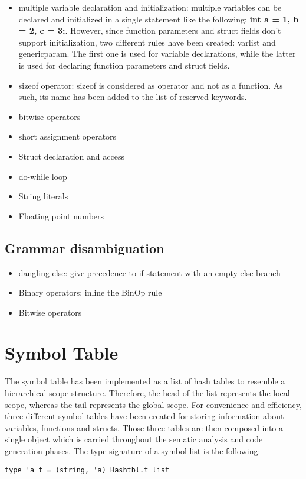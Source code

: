 \documentclass{article}
\begin{document}
\begin{itemize}
    \item multiple variable declaration and initialization: multiple variables can be declared and initialized in a single statement
    like the following: \textbf{int a = 1, b = 2, c = 3;}. However, since function parameters and struct fields don't support initialization,
    two different rules have been created: varlist and genericparam. The first one is used for variable declarations,
    while the latter is used for declaring function parameters and struct fields.
    \item sizeof operator: sizeof is considered as operator and not as a function. As such, its name has been added to the list of reserved keywords.
    \item bitwise operators
    \item short assignment operators
    \item Struct declaration and access
    \item do-while loop
    \item String literals
    \item Floating point numbers
\end{itemize}
\subsection*{Grammar disambiguation}
\begin{itemize}
  \item dangling else: give precedence to if statement with an empty else branch
  \item Binary operators: inline the BinOp rule
  \item Bitwise operators
\end{itemize}

\section{Symbol Table}
The symbol table has been implemented as a list of hash tables to resemble a hierarchical scope structure.
Therefore, the head of the list represents the local scope, whereas the tail represents the global scope.
For convenience and efficiency, three different symbol tables have been created for storing information about variables, functions and structs.
Those three tables are then composed into a single object which is carried throughout the sematic analysis and code generation phases.
The type signature of a symbol list is the following:
\begin{lstlisting}
type 'a t = (string, 'a) Hashtbl.t list
\end{lstlisting}
\end{document}

